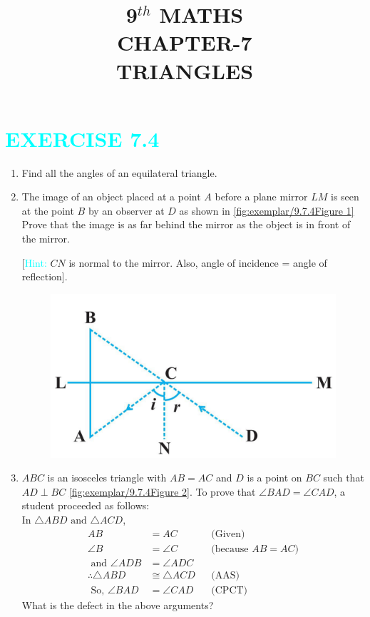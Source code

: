 \documentclass {article}
\title{9$^{th}$ MATHS\\CHAPTER-7\\TRIANGLES}
\date{}
\begin{document}

\maketitle
\section*{\textcolor{cyan}{ EXERCISE 7.4}} 
\begin {enumerate}
\fi
\begin{enumerate}[label=\thesection.\arabic*,ref=\thesection.\theenumi]
\item Find all the angles of an equilateral triangle.
\item The image of an object placed at a point $A$ before a plane mirror $LM$ is seen at the point $B$ by an observer at $D$ as shown in \eqref{fig:exemplar/9.7.4Figure 1} Prove that the image is as far behind the mirror as the object is in front  of the mirror.

[\textcolor{cyan}{Hint:} $CN$ is normal to the mirror. Also, angle of incidence = angle of reflection].
\begin{figure}[!h]
\centering
 \includegraphics[width=\columnwidth]{./exemplar/9.7.4/figs/7A.png}
\caption{}
\label{fig:exemplar/9.7.4Figure 1}
\end{figure}
\item $ABC$ is an isosceles triangle with $AB = AC$ and $D$ is a point on $BC$ such that $AD\perp  BC$ \eqref{fig:exemplar/9.7.4Figure 2}. To prove that $\angle BAD = \angle CAD$, a student proceeded as follows:\\
In $\triangle  ABD \text{ and }\triangle  ACD$,
\begin{align}
AB &= AC &&\text{(Given)}\\
\angle B &= \angle C &&\text{(because $AB = AC$)}\\
\text{ and }
\angle ADB &= \angle ADC\\
\therefore \triangle  ABD &\cong  \triangle ACD &&\text {(AAS)} \\
\text { So, }  \angle BAD &= \angle CAD &&\text{(CPCT)}
\end{align}
What is the defect in the above arguments?


\end{enumerate}
\end{enumerate}
\end{document}
